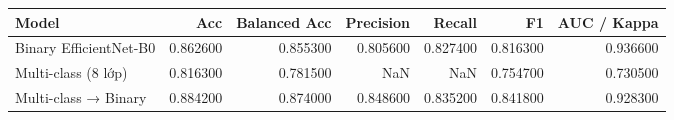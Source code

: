 \begin{tabular}{lrrrrrr}
\toprule
Model & Acc & Balanced Acc & Precision & Recall & F1 & AUC / Kappa \\
\midrule
Binary EfficientNet-B0 & 0.862600 & 0.855300 & 0.805600 & 0.827400 & 0.816300 & 0.936600 \\
Multi-class (8 lớp) & 0.816300 & 0.781500 & NaN & NaN & 0.754700 & 0.730500 \\
Multi-class → Binary & 0.884200 & 0.874000 & 0.848600 & 0.835200 & 0.841800 & 0.928300 \\
\bottomrule
\end{tabular}

